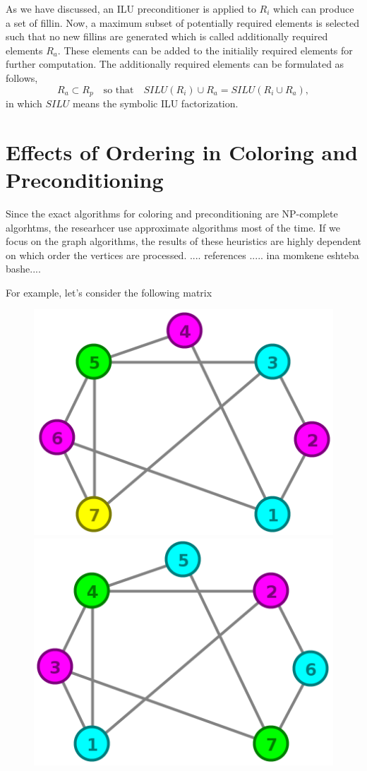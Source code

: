 \documentclass[12pt, oneside]{book}
\begin{document}
As we have discussed, an ILU preconditioner is applied to $R_i$ which can
produce a set of fillin. Now, a maximum subset of potentially required elements
is selected such that no new fillins are generated which is called
additionally required elements $R_a$. These elements can be added to the
initialily required elements for further computation. 
The additionally required elements can be formulated as follows,
$$
R_a \subset R_p \quad\text{so that}\quad SILU(R_i) \cup R_a = SILU(R_i\cup R_a),
$$ 
in which $SILU$ means the symbolic ILU factorization.



\chapter{Effects of Ordering in Coloring and Preconditioning}
\label{package}

Since the exact algorithms for coloring and preconditioning are 
NP-complete algorhtms, the researhcer use approximate algorithms
most of the time. If we focus on the graph algorithms, 
the results of these heuristics are highly dependent 
on which order the vertices are processed. 
.... references .....
ina momkene eshteba bashe....

For example, let's consider the following matrix
\begin{figure}
\centering
   \includegraphics[width=0.45\linewidth]{bad_order_color}
   \hfill
   \includegraphics[width=0.45\linewidth]{good_order_color}
\end{figure}
\end{document}
